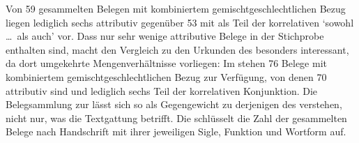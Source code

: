 Von 59 gesammelten Belegen mit kombiniertem gemischtgeschlechtlichen Bezug
liegen lediglich sechs attributiv gegenüber 53 mit 
als Teil der korrelativen   `sowohl
\dots\ als auch' vor. Dass nur sehr wenige
attributive Belege in der Stichprobe enthalten sind, macht den Vergleich
zu den Urkunden des \CAO{} besonders interessant, da dort
umgekehrte Mengenverhältnisse vorliegen: Im \CAO{} stehen 76 Belege mit
kombiniertem gemischtgeschlechtlichen Bezug zur Verfügung, von denen 70
attributiv sind und lediglich sechs Teil der korrelativen Konjunktion. Die
Belegsammlung zur \KC{} lässt sich so als Gegengewicht zu derjenigen des \CAO{}
verstehen, nicht nur, was die Textgattung betrifft. Die 
schlüsselt die Zahl der gesammelten Belege nach Handschrift mit ihrer
jeweiligen Sigle, Funktion und Wortform auf.

